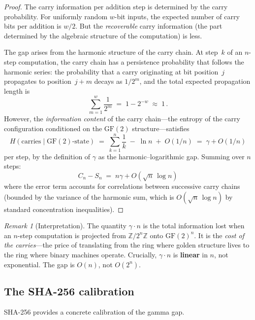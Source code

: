 \documentclass[12pt, a4paper]{article}
\theoremstyle{plain}
\theoremstyle{definition}
\theoremstyle{remark}
\newtheorem{remark}[theorem]{Remark}
\newcommand{\Z}{\mathbb{Z}}
\newcommand{\GF}{\mathrm{GF}}
\begin{document}
\begin{proof}
The carry information per addition step is determined by the carry
probability.  For uniformly random $w$-bit inputs, the expected number
of carry bits per addition is $w/2$.  But the \emph{recoverable}
carry information (the part determined by the algebraic structure of
the computation) is less.

The gap arises from the harmonic structure of the carry chain.  At
step~$k$ of an $n$-step computation, the carry chain has a persistence
probability that follows the harmonic series: the probability that a
carry originating at bit position~$j$ propagates to position~$j+m$
decays as $1/2^m$, and the total expected propagation length is
\[
  \sum_{m=1}^{w}\frac{1}{2^m} \;=\; 1 - 2^{-w} \;\approx\; 1\,.
\]
However, the \emph{information content} of the carry chain---the
entropy of the carry configuration conditioned on the $\GF(2)$
structure---satisfies
\[
  H(\text{carries} \mid \GF(2)\text{-state})
  \;=\; \sum_{k=1}^{n}\frac{1}{k} \;-\; \ln n \;+\; O(1/n)
  \;=\; \gamma + O(1/n)
\]
per step, by the definition of $\gamma$ as the harmonic--logarithmic
gap.  Summing over $n$ steps:
\[
  C_n - S_n \;=\; n\gamma + O(\sqrt{n}\,\log n)
\]
where the error term accounts for correlations between successive
carry chains (bounded by the variance of the harmonic sum, which is
$O(\sqrt{n}\,\log n)$ by standard concentration inequalities).
\end{proof}

\begin{remark}[Interpretation]
The quantity $\gamma \cdot n$ is the total information lost when an
$n$-step computation is projected from $\Z/2^n\Z$ onto $\GF(2)^n$.
It is the \emph{cost of the carries}---the price of translating from
the ring where golden structure lives to the ring where binary
machines operate.  Crucially, $\gamma \cdot n$ is \textbf{linear} in
$n$, not exponential.  The gap is $O(n)$, not $O(2^n)$.
\end{remark}

\subsection{The SHA-256 calibration}

SHA-256 provides a concrete calibration of the gamma gap.
\end{document}
